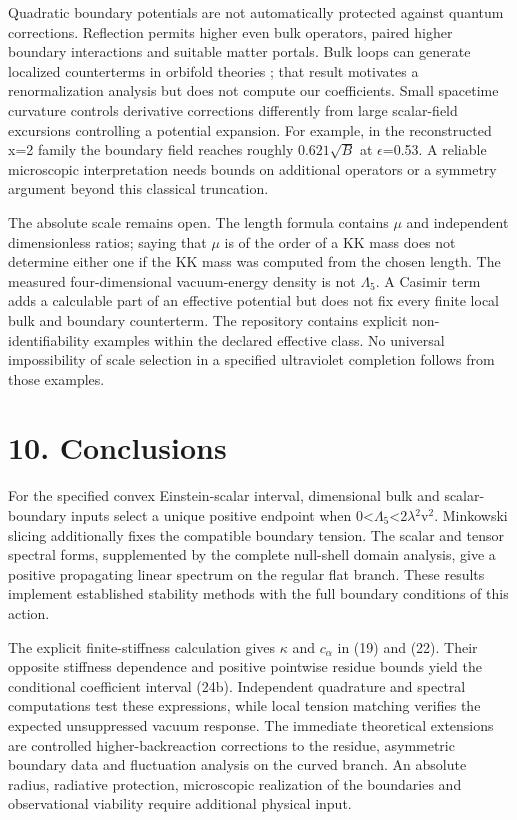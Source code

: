 \documentclass[11pt,a4paper]{article}
\begin{document}
Quadratic boundary potentials are not automatically protected against quantum corrections. Reflection permits higher even bulk operators, paired higher boundary interactions and suitable matter portals. Bulk loops can generate localized counterterms in orbifold theories \cite{ref18}; that result motivates a renormalization analysis but does not compute our coefficients. Small spacetime curvature controls derivative corrections differently from large scalar-field excursions controlling a potential expansion. For example, in the reconstructed x=2 family the boundary field reaches roughly \ensuremath{0.621\sqrt{B}} at \ensuremath{\epsilon}=0.53. A reliable microscopic interpretation needs bounds on additional operators or a symmetry argument beyond this classical truncation.

The absolute scale remains open. The length formula contains \ensuremath{\mu} and independent dimensionless ratios; saying that \ensuremath{\mu} is of the order of a KK mass does not determine either one if the KK mass was computed from the chosen length. The measured four-dimensional vacuum-energy density is not \ensuremath{\Lambda}\ensuremath{{}_{5}}. A Casimir term adds a calculable part of an effective potential but does not fix every finite local bulk and boundary counterterm. The repository contains explicit non-identifiability examples within the declared effective class. No universal impossibility of scale selection in a specified ultraviolet completion follows from those examples.

\section*{10. Conclusions}
For the specified convex Einstein-scalar interval, dimensional bulk and scalar-boundary inputs select a unique positive endpoint when 0<\ensuremath{\Lambda}\ensuremath{{}_{5}}<2\ensuremath{\lambda}\ensuremath{{}^{2}}v\ensuremath{{}^{2}}. Minkowski slicing additionally fixes the compatible boundary tension. The scalar and tensor spectral forms, supplemented by the complete null-shell domain analysis, give a positive propagating linear spectrum on the regular flat branch. These results implement established stability methods with the full boundary conditions of this action.

The explicit finite-stiffness calculation gives \ensuremath{\kappa} and \ensuremath{c_\alpha} in (19) and (22). Their opposite stiffness dependence and positive pointwise residue bounds yield the conditional coefficient interval (24b). Independent quadrature and spectral computations test these expressions, while local tension matching verifies the expected unsuppressed vacuum response. The immediate theoretical extensions are controlled higher-backreaction corrections to the residue, asymmetric boundary data and fluctuation analysis on the curved branch. An absolute radius, radiative protection, microscopic realization of the boundaries and observational viability require additional physical input.
\end{document}
